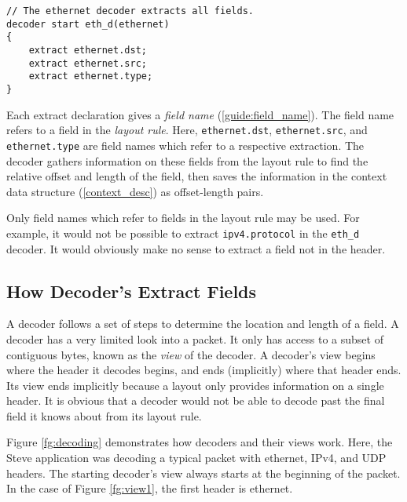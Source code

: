 \begin{codepage}
\begin{lstlisting}
// The ethernet decoder extracts all fields.
decoder start eth_d(ethernet)
{
	extract ethernet.dst;
	extract ethernet.src;
	extract ethernet.type;
}
\end{lstlisting}
\end{codepage}

Each extract declaration gives a \textit{field name} (\ref{guide:field_name}).
The field name refers to a field in the \textit{layout rule}. Here,
\texttt{ethernet.dst}, \texttt{ethernet.src}, and \texttt{ethernet.type} are
field names which refer to a respective extraction. The decoder
gathers information on these fields from the layout rule to find the relative offset and length of the field, then saves the information
in the context data structure (\ref{context_desc}) as offset-length pairs.

Only field names which refer to fields in the layout rule may be used. For example, it would not be possible to extract \texttt{ipv4.protocol} in the \texttt{eth\_d} decoder. It would
obviously make no sense to extract a field not in the header. 

\subsection{How Decoder's Extract Fields} \label{tut:extract_how}

A decoder follows a set of steps to determine the location and length of a field. A decoder has a very limited look into a packet. It only has
access to a subset of contiguous bytes, known as the \textit{view} of the
decoder. A decoder's view begins where the header it decodes begins, and ends
(implicitly) where that header ends. Its view ends implicitly because a layout
only provides information on a single header. It is obvious that a
decoder would not be able to decode past the final field it knows about from its
layout rule.

Figure \ref{fg:decoding} demonstrates how decoders and their views work. Here, the Steve application was decoding a typical packet with ethernet, IPv4, and UDP headers. The
starting decoder's view always starts at the beginning of the packet. In the
case of Figure \ref{fg:view1}, the first header is ethernet.

